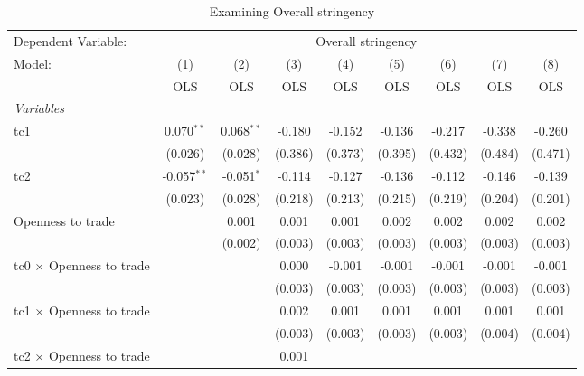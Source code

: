 
\begin{table}[htbp]
   \caption{Examining Overall stringency}
   \centering
   \begin{tabular}{lcccccccc}
      \toprule
      Dependent Variable: & \multicolumn{8}{c}{Overall stringency}\\
      Model:                                  & (1)           & (2)          & (3)     & (4)     & (5)     & (6)     & (7)     & (8)\\  
                                              &  OLS          & OLS          & OLS     & OLS     & OLS     & OLS     & OLS     & OLS\\  
      \midrule
      \emph{Variables}\\
      tc1                                     & 0.070$^{**}$  & 0.068$^{**}$ & -0.180  & -0.152  & -0.136  & -0.217  & -0.338  & -0.260\\   
                                              & (0.026)       & (0.028)      & (0.386) & (0.373) & (0.395) & (0.432) & (0.484) & (0.471)\\   
      tc2                                     & -0.057$^{**}$ & -0.051$^{*}$ & -0.114  & -0.127  & -0.136  & -0.112  & -0.146  & -0.139\\   
                                              & (0.023)       & (0.028)      & (0.218) & (0.213) & (0.215) & (0.219) & (0.204) & (0.201)\\   
      Openness to trade                       &               & 0.001        & 0.001   & 0.001   & 0.002   & 0.002   & 0.002   & 0.002\\   
                                              &               & (0.002)      & (0.003) & (0.003) & (0.003) & (0.003) & (0.003) & (0.003)\\   
      tc0 $\times$ Openness to trade          &               &              & 0.000   & -0.001  & -0.001  & -0.001  & -0.001  & -0.001\\   
                                              &               &              & (0.003) & (0.003) & (0.003) & (0.003) & (0.003) & (0.003)\\   
      tc1 $\times$ Openness to trade          &               &              & 0.002   & 0.001   & 0.001   & 0.001   & 0.001   & 0.001\\   
                                              &               &              & (0.003) & (0.003) & (0.003) & (0.003) & (0.004) & (0.004)\\   
      tc2 $\times$ Openness to trade          &               &              & 0.001   &         &         &         &         &   \\   

\end{tabular}
\end{table}
